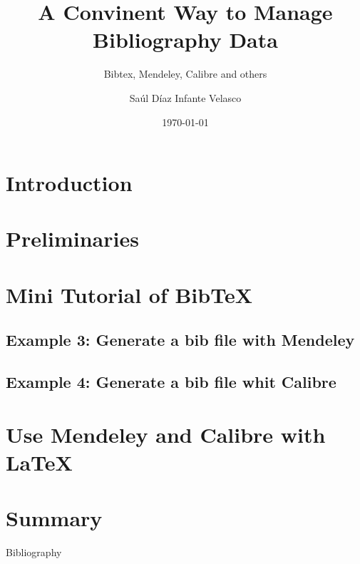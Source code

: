 \documentclass[hyperref={pdfpagelabels=false},usepdftitle=false]{beamer}
\begin{document}
	\title{A Convinent Way to Manage Bibliography Data}
	\subtitle{Bibtex, Mendeley, Calibre and others}
	\author{Sa\'ul D\'iaz Infante Velasco}
	\date{\today}	
	\frame{\titlepage}
		
	\AtBeginSection[]{
    	\InsertToC[sections={\thesection}]  %
	}
	\section*{Introduction}
		
	\section{Preliminaries}
		
	\section{Mini Tutorial of Bib\TeX}
		
	\subsection{Example 3: Generate a bib file with Mendeley}
	\subsection{Example 4: Generate a bib file whit Calibre}
	\section{Use Mendeley and Calibre with \LaTeX}
		
	\section{Summary}
		
	\begin{frame}{Bibliography}
		\nocite{*}
		\printbibliography 
	\end{frame}
\end{document}
